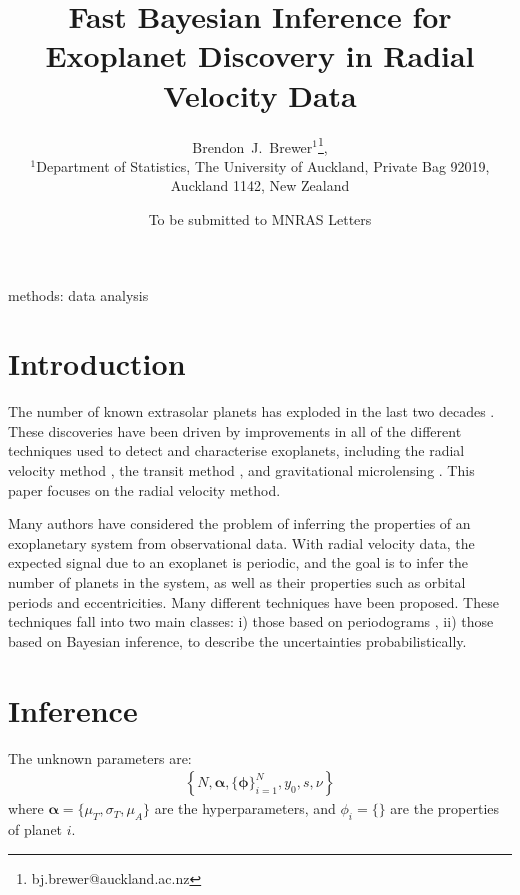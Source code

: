 \documentclass[useAMS,usenatbib]{mn2e}
\title[]
{Fast Bayesian Inference for Exoplanet Discovery in Radial Velocity Data}
\author[Brewer]{%
  Brendon~J.~Brewer$^{1}$\thanks{bj.brewer@auckland.ac.nz},
  \medskip\\
  $^1$Department of Statistics, The University of Auckland, Private Bag 92019, Auckland 1142, New Zealand}
\begin{document}
             
\date{To be submitted to MNRAS Letters}
             
\maketitle

\label{firstpage}


\begin{abstract}
\end{abstract}

\begin{keywords}
methods: data analysis
\end{keywords}


\section{Introduction}
The number of known extrasolar planets has exploded in the last two
decades \citep{}. These discoveries have been driven by improvements in
all of the different techniques used to detect and characterise exoplanets,
including the radial velocity method \citep[e.g.][]{},
the transit method \citep[e.g.]{},
and gravitational microlensing \citep[e.g.][]{}. This paper focuses on the
radial velocity method.

Many authors have considered the problem of inferring the properties of an
exoplanetary system from observational data. With radial velocity data,
the expected signal due to an exoplanet is periodic, and the goal is to
infer the number of planets in the system, as well as their properties such
as orbital periods and eccentricities. Many
different techniques have been proposed. These techniques fall into two main
classes: i) those based on periodograms \citep[e.g.][]{}, ii) those based on
Bayesian inference, to describe the uncertainties probabilistically.

\section{Inference}

The unknown parameters are:
\begin{eqnarray}
\left\{N, \boldsymbol{\alpha}, \{\boldsymbol{\phi}\}_{i=1}^N, y_0, s, \nu\right\}
\end{eqnarray}
where $\boldsymbol{\alpha} = \{\mu_T, \sigma_T, \mu_A\}$ are the
hyperparameters, and $\phi_i = \{\}$ are the properties of planet $i$.
\end{document}
